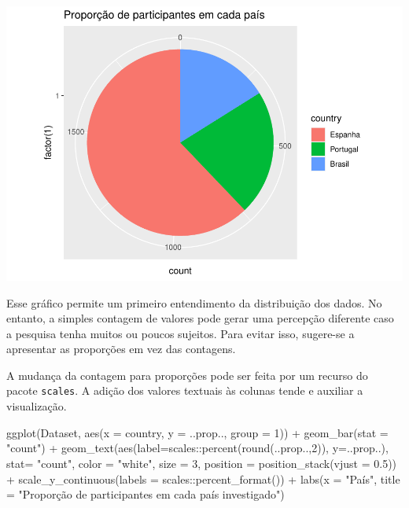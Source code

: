 \documentclass[
]{book}
\newenvironment{Shaded}{\begin{snugshade}}{\end{snugshade}}
\newcommand{\AttributeTok}[1]{\textcolor[rgb]{0.77,0.63,0.00}{#1}}
\newcommand{\DecValTok}[1]{\textcolor[rgb]{0.00,0.00,0.81}{#1}}
\newcommand{\FloatTok}[1]{\textcolor[rgb]{0.00,0.00,0.81}{#1}}
\newcommand{\FunctionTok}[1]{\textcolor[rgb]{0.00,0.00,0.00}{#1}}
\newcommand{\NormalTok}[1]{#1}
\newcommand{\SpecialCharTok}[1]{\textcolor[rgb]{0.00,0.00,0.00}{#1}}
\newcommand{\StringTok}[1]{\textcolor[rgb]{0.31,0.60,0.02}{#1}}
\begin{document}
\begin{center}\includegraphics{gitbook-demo_files/figure-latex/unnamed-chunk-15-1} \end{center}

Esse gráfico permite um primeiro entendimento da distribuição dos dados. No entanto, a simples contagem de valores pode gerar uma percepção diferente caso a pesquisa tenha muitos ou poucos sujeitos. Para evitar isso, sugere-se a apresentar as proporções em vez das contagens.

A mudança da contagem para proporções pode ser feita por um recurso do pacote \texttt{scales}. A adição dos valores textuais às colunas tende e auxiliar a visualização.

\begin{Shaded}
\begin{Highlighting}[]
\FunctionTok{ggplot}\NormalTok{(Dataset, }\FunctionTok{aes}\NormalTok{(}\AttributeTok{x =}\NormalTok{ country, }\AttributeTok{y =}\NormalTok{ ..prop.., }\AttributeTok{group =} \DecValTok{1}\NormalTok{)) }\SpecialCharTok{+} 
  \FunctionTok{geom\_bar}\NormalTok{(}\AttributeTok{stat =} \StringTok{"count"}\NormalTok{) }\SpecialCharTok{+}
  \FunctionTok{geom\_text}\NormalTok{(}\FunctionTok{aes}\NormalTok{(}\AttributeTok{label=}\NormalTok{scales}\SpecialCharTok{::}\FunctionTok{percent}\NormalTok{(}\FunctionTok{round}\NormalTok{(..prop..,}\DecValTok{2}\NormalTok{)), }
                \AttributeTok{y=}\NormalTok{..prop..), }
            \AttributeTok{stat=} \StringTok{"count"}\NormalTok{, }\AttributeTok{color =} \StringTok{"white"}\NormalTok{, }
            \AttributeTok{size =} \DecValTok{3}\NormalTok{, }\AttributeTok{position =} \FunctionTok{position\_stack}\NormalTok{(}\AttributeTok{vjust =} \FloatTok{0.5}\NormalTok{)) }\SpecialCharTok{+}
  \FunctionTok{scale\_y\_continuous}\NormalTok{(}\AttributeTok{labels =}\NormalTok{ scales}\SpecialCharTok{::}\FunctionTok{percent\_format}\NormalTok{()) }\SpecialCharTok{+}
  \FunctionTok{labs}\NormalTok{(}\AttributeTok{x =} \StringTok{"País"}\NormalTok{,}
       \AttributeTok{title =} 
         \StringTok{"Proporção de participantes em cada país investigado"}\NormalTok{)}
\end{Highlighting}
\end{Shaded}
\end{document}
